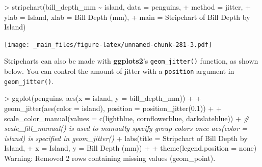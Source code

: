 \documentclass[
]{book}
\newenvironment{Shaded}{\begin{snugshade}}{\end{snugshade}}
\newcommand{\AttributeTok}[1]{\textcolor[rgb]{0.77,0.63,0.00}{#1}}
\newcommand{\CommentTok}[1]{\textcolor[rgb]{0.56,0.35,0.01}{\textit{#1}}}
\newcommand{\DecValTok}[1]{\textcolor[rgb]{0.00,0.00,0.81}{#1}}
\newcommand{\FloatTok}[1]{\textcolor[rgb]{0.00,0.00,0.81}{#1}}
\newcommand{\FunctionTok}[1]{\textcolor[rgb]{0.00,0.00,0.00}{#1}}
\newcommand{\NormalTok}[1]{#1}
\newcommand{\SpecialCharTok}[1]{\textcolor[rgb]{0.00,0.00,0.00}{#1}}
\newcommand{\StringTok}[1]{\textcolor[rgb]{0.31,0.60,0.02}{#1}}
\begin{document}
\begin{Shaded}
\begin{Highlighting}[]
\SpecialCharTok{\textgreater{}} \FunctionTok{stripchart}\NormalTok{(bill\_depth\_mm }\SpecialCharTok{\textasciitilde{}}\NormalTok{ island, }\AttributeTok{data =}\NormalTok{ penguins, }
\SpecialCharTok{+}            \AttributeTok{method =} \StringTok{\textquotesingle{}jitter\textquotesingle{}}\NormalTok{,}
\SpecialCharTok{+}            \AttributeTok{ylab =} \StringTok{\textquotesingle{}Island\textquotesingle{}}\NormalTok{, }\AttributeTok{xlab =} \StringTok{\textquotesingle{}Bill Depth (mm)\textquotesingle{}}\NormalTok{, }
\SpecialCharTok{+}            \AttributeTok{main =} \StringTok{\textquotesingle{}Stripchart of Bill Depth by Island\textquotesingle{}}\NormalTok{)}
\end{Highlighting}
\end{Shaded}

\texttt{[image: \_main\_files/figure-latex/unnamed-chunk-281-3.pdf]}

Stripcharts can also be made with \textbf{ggplots2}'s \texttt{geom\_jitter()} function, as shown below. You can control the amount of jitter with a \texttt{position} argument in \texttt{geom\_jitter()}.

\begin{Shaded}
\begin{Highlighting}[]
\SpecialCharTok{\textgreater{}} \FunctionTok{ggplot}\NormalTok{(penguins, }\FunctionTok{aes}\NormalTok{(}\AttributeTok{x =}\NormalTok{ island, }\AttributeTok{y =}\NormalTok{ bill\_depth\_mm)) }\SpecialCharTok{+}
\SpecialCharTok{+}   \FunctionTok{geom\_jitter}\NormalTok{(}\FunctionTok{aes}\NormalTok{(}\AttributeTok{color =}\NormalTok{ island), }\AttributeTok{position =} \FunctionTok{position\_jitter}\NormalTok{(}\FloatTok{0.1}\NormalTok{)) }\SpecialCharTok{+}
\SpecialCharTok{+}   \FunctionTok{scale\_color\_manual}\NormalTok{(}\AttributeTok{values =} \FunctionTok{c}\NormalTok{(}\StringTok{\textquotesingle{}lightblue\textquotesingle{}}\NormalTok{, }\StringTok{\textquotesingle{}cornflowerblue\textquotesingle{}}\NormalTok{, }\StringTok{\textquotesingle{}darkslateblue\textquotesingle{}}\NormalTok{)) }\SpecialCharTok{+} \CommentTok{\# scale\_fill\_manual() is used to manually specify group colors once aes(color = island) is specified in \textasciigrave{}geom\_jitter()\textasciigrave{}}
\SpecialCharTok{+}   \FunctionTok{labs}\NormalTok{(}\AttributeTok{title =} \StringTok{\textquotesingle{}Stripchart of Bill Depth by Island\textquotesingle{}}\NormalTok{, }
\SpecialCharTok{+}        \AttributeTok{x =} \StringTok{\textquotesingle{}Island\textquotesingle{}}\NormalTok{, }\AttributeTok{y =} \StringTok{\textquotesingle{}Bill Depth (mm)\textquotesingle{}}\NormalTok{) }\SpecialCharTok{+}
\SpecialCharTok{+}   \FunctionTok{theme}\NormalTok{(}\AttributeTok{legend.position =} \StringTok{\textquotesingle{}none\textquotesingle{}}\NormalTok{)}
\NormalTok{Warning}\SpecialCharTok{:}\NormalTok{ Removed }\DecValTok{2}\NormalTok{ rows containing missing }\FunctionTok{values}\NormalTok{ (geom\_point).}
\end{Highlighting}
\end{Shaded}
\end{document}
